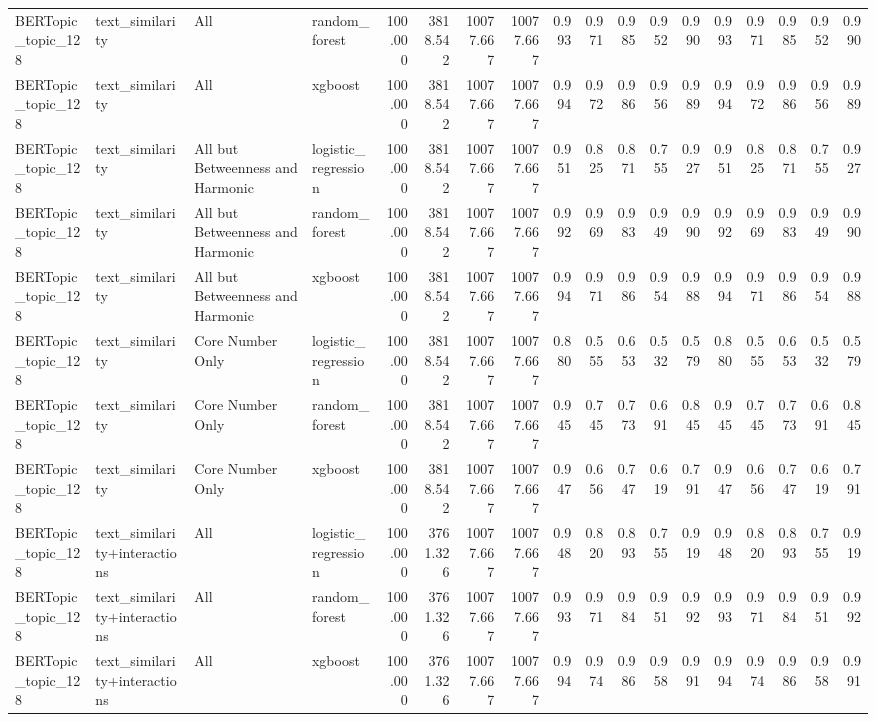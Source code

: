 \begin{tabular}{llllrrrrrrrrrrrrrr}
BERTopic_topic_128 & text_similarity & All & random_forest & 100.000 & 3818.542 & 10077.667 & 10077.667 & 0.993 & 0.971 & 0.985 & 0.952 & 0.990 & 0.993 & 0.971 & 0.985 & 0.952 & 0.990 \\
BERTopic_topic_128 & text_similarity & All & xgboost & 100.000 & 3818.542 & 10077.667 & 10077.667 & 0.994 & 0.972 & 0.986 & 0.956 & 0.989 & 0.994 & 0.972 & 0.986 & 0.956 & 0.989 \\
BERTopic_topic_128 & text_similarity & All but Betweenness and Harmonic & logistic_regression & 100.000 & 3818.542 & 10077.667 & 10077.667 & 0.951 & 0.825 & 0.871 & 0.755 & 0.927 & 0.951 & 0.825 & 0.871 & 0.755 & 0.927 \\
BERTopic_topic_128 & text_similarity & All but Betweenness and Harmonic & random_forest & 100.000 & 3818.542 & 10077.667 & 10077.667 & 0.992 & 0.969 & 0.983 & 0.949 & 0.990 & 0.992 & 0.969 & 0.983 & 0.949 & 0.990 \\
BERTopic_topic_128 & text_similarity & All but Betweenness and Harmonic & xgboost & 100.000 & 3818.542 & 10077.667 & 10077.667 & 0.994 & 0.971 & 0.986 & 0.954 & 0.988 & 0.994 & 0.971 & 0.986 & 0.954 & 0.988 \\
BERTopic_topic_128 & text_similarity & Core Number Only & logistic_regression & 100.000 & 3818.542 & 10077.667 & 10077.667 & 0.880 & 0.555 & 0.653 & 0.532 & 0.579 & 0.880 & 0.555 & 0.653 & 0.532 & 0.579 \\
BERTopic_topic_128 & text_similarity & Core Number Only & random_forest & 100.000 & 3818.542 & 10077.667 & 10077.667 & 0.945 & 0.745 & 0.773 & 0.691 & 0.845 & 0.945 & 0.745 & 0.773 & 0.691 & 0.845 \\
BERTopic_topic_128 & text_similarity & Core Number Only & xgboost & 100.000 & 3818.542 & 10077.667 & 10077.667 & 0.947 & 0.656 & 0.747 & 0.619 & 0.791 & 0.947 & 0.656 & 0.747 & 0.619 & 0.791 \\
BERTopic_topic_128 & text_similarity+interactions & All & logistic_regression & 100.000 & 3761.326 & 10077.667 & 10077.667 & 0.948 & 0.820 & 0.893 & 0.755 & 0.919 & 0.948 & 0.820 & 0.893 & 0.755 & 0.919 \\
BERTopic_topic_128 & text_similarity+interactions & All & random_forest & 100.000 & 3761.326 & 10077.667 & 10077.667 & 0.993 & 0.971 & 0.984 & 0.951 & 0.992 & 0.993 & 0.971 & 0.984 & 0.951 & 0.992 \\
BERTopic_topic_128 & text_similarity+interactions & All & xgboost & 100.000 & 3761.326 & 10077.667 & 10077.667 & 0.994 & 0.974 & 0.986 & 0.958 & 0.991 & 0.994 & 0.974 & 0.986 & 0.958 & 0.991 \\

\end{tabular}
